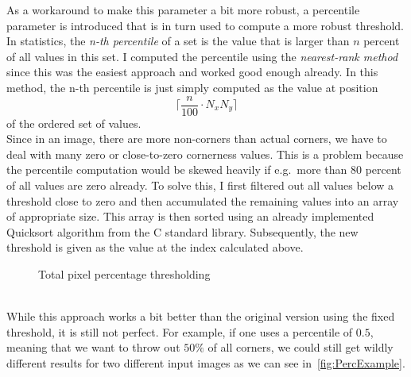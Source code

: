  As a workaround to make this parameter a bit more robust, a percentile
parameter is introduced that is in turn used to compute a more robust threshold.\\
In statistics, the \textit{n-th percentile} of a set is the value that is larger than $n$ percent
of all values in this set.
I computed the percentile using the \textit{nearest-rank method} since this was the easiest
approach and worked good enough already. In this method, the n-th percentile is just simply
computed as the value at position 
\[
\lceil \frac{n}{100}\cdot N_{x}N_{y}\rceil
\] 
of the ordered set of values\cite{percentile}.\\
Since in an image, there are more non-corners than actual corners, we have to deal with many zero
or close-to-zero cornerness values. This is a problem because the percentile computation would be skewed
heavily if e.g.\ more than 80 percent of all values are zero already. To solve this, I first filtered
out all values below a threshold close to zero and then accumulated the remaining values into an
array of appropriate size. This array is then sorted using an already implemented Quicksort
algorithm from the C standard library. Subsequently, the new threshold is given as the value at
the index calculated above.
\begin{figure}[ht]
    
    \caption{Total pixel percentage thresholding}
\end{figure}\\
While this approach works a bit better than the original version using the fixed threshold, it is
still not perfect. For example, if one uses a percentile of $0.5$, meaning that we want to throw
out $50\%$ of all corners, we could still get wildly different results for two different input
images as we can see in~\ref{fig:PercExample}.
